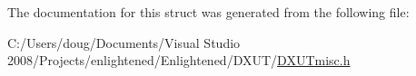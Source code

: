 The documentation for this struct was generated from the following file:\begin{DoxyCompactItemize}
\item 
C:/Users/doug/Documents/Visual Studio 2008/Projects/enlightened/Enlightened/DXUT/\hyperlink{_d_x_u_tmisc_8h}{DXUTmisc.h}\end{DoxyCompactItemize}
